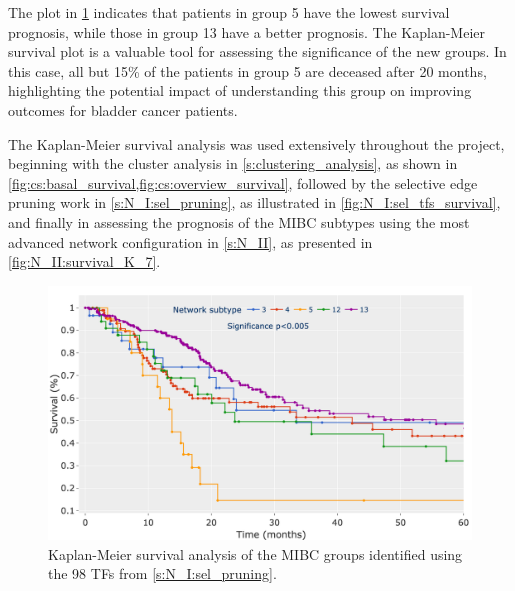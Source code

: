The plot in \cref{fig:lit:surival_eg} indicates that patients in group 5 have the lowest survival prognosis, while those in group 13 have a better prognosis. The Kaplan-Meier survival plot is a valuable tool for assessing the significance of the new groups. In this case, all but 15\% of the patients in group 5 are deceased after 20 months, highlighting the potential impact of understanding this group on improving outcomes for bladder cancer patients.

The Kaplan-Meier survival analysis was used extensively throughout the project, beginning with the cluster analysis in \cref{s:clustering_analysis}, as shown in \cref{fig:cs:basal_survival,fig:cs:overview_survival}, followed by the selective edge pruning work in \cref{s:N_I:sel_pruning}, as illustrated in \cref{fig:N_I:sel_tfs_survival}, and finally in assessing the prognosis of the MIBC subtypes using the most advanced network configuration in \cref{s:N_II}, as presented in \cref{fig:N_II:survival_K_7}.


\begin{figure}[!htb]
    \centering
    \includegraphics[width=1.0\textwidth,height=1.0\textheight,keepaspectratio]
    {Sections/Network_I/Resources/selective_pruning/sel_tfs/survival_sel_tfs_cs.png}
    \caption{Kaplan-Meier survival analysis of the MIBC groups identified using the 98 TFs from \cref{s:N_I:sel_pruning}.}
    \label{fig:lit:surival_eg}
\end{figure}
